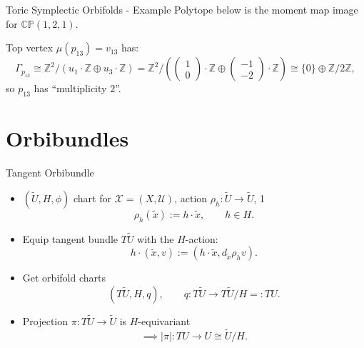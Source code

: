 \documentclass[aspectratio=169,xcolor=dvipsnames]{beamer}
\newcommand{\ra}{\rightarrow}
\newcommand{\ZZ}{\mathbb{Z}}
\newcommand{\CC}{\mathbb{C}}
\newcommand{\PP}{\mathbb{P}}
\begin{document}
\begin{frame}{Toric Symplectic Orbifolds - Example}
	Polytope below is the moment map image for $\CC\PP(1,2,1)$.
	\begin{figure}[h!]
		\centering
	\end{figure}
	Top vertex $\mu(p_{13}) = v_{13}$ has:
	\[
		\Gamma_{p_{13}} \cong \ZZ^{2} / \left(u_{1}\cdot \ZZ \oplus u_{3}\cdot \ZZ \right) = \ZZ^{2} / \left(\begin{pmatrix} 1 \\ 0 \end{pmatrix} \cdot \ZZ \oplus \begin{pmatrix} -1 \\ -2 \end{pmatrix}\cdot \ZZ \right) \cong \{0\} \oplus \ZZ/2\ZZ,
	\]
	so $p_{13}$ has ``multiplicity $2$''.
\end{frame}

\section{Orbibundles}

\begin{frame}{Tangent Orbibundle}
	\begin{itemize}
		\item $(\widetilde{U}, H, \phi)$ chart for $\mathcal{X} = (X, \mathcal{U})$, action $\rho_{h} : \widetilde{U} \ra \widetilde{U}$,
1		\[
		\rho_{h}(\tilde{x}) := h \cdot \tilde{x}, \qquad h \in H.  
		\]
		\item Equip tangent bundle $T\widetilde{U}$ with the $H$-action:
		\[
		h \cdot (\tilde{x}, v) := \left( h \cdot \tilde{x}, d_{\tilde{x}}\rho_{h}v \right).
		\]
		\item Get orbifold charts
		\[
		\left(T\widetilde{U}, H, q\right), \qquad q : T\widetilde{U} \ra T\widetilde{U}/H =: TU.
		\]
		\item Projection $\pi : T\widetilde{U} \ra \widetilde{U}$ is $H$-equivariant
		\[
		\implies |\pi| : TU \ra U \cong \widetilde{U}/H.
		\]
	\end{itemize}
\end{frame}
\end{document}
